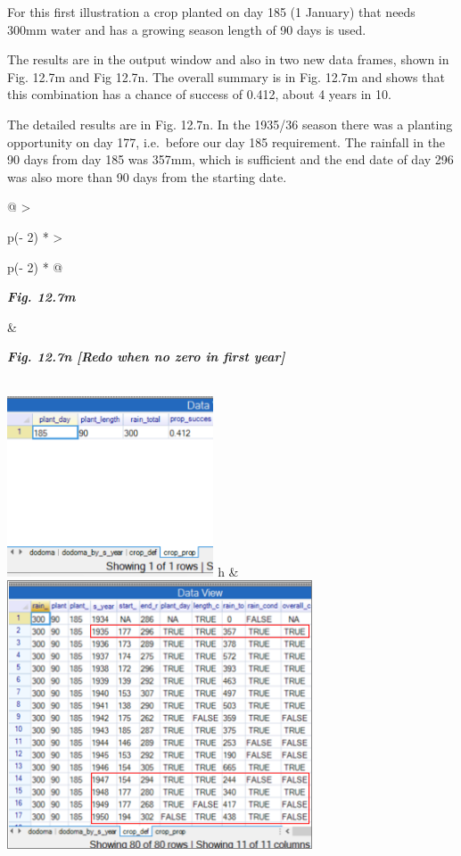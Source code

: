 \documentclass[
  letterpaper,
  DIV=11,
  numbers=noendperiod]{scrreprt}
\begin{document}
For this first illustration a crop planted on day 185 (1 January) that
needs 300mm water and has a growing season length of 90 days is used.

The results are in the output window and also in two new data frames,
shown in Fig. 12.7m and Fig 12.7n. The overall summary is in Fig. 12.7m
and shows that this combination has a chance of success of 0.412, about
4 years in 10.

The detailed results are in Fig. 12.7n. In the 1935/36 season there was
a planting opportunity on day 177, i.e.~before our day 185 requirement.
The rainfall in the 90 days from day 185 was 357mm, which is sufficient
and the end date of day 296 was also more than 90 days from the starting
date.

\begin{longtable}[]{@{}
  >{\raggedright\arraybackslash}p{(\columnwidth - 2\tabcolsep) * }
  >{\raggedright\arraybackslash}p{(\columnwidth - 2\tabcolsep) * }@{}}
\toprule\noalign{}
\begin{minipage}[b]{\linewidth}\raggedright
\textbf{\emph{Fig. 12.7m}}
\end{minipage} & \begin{minipage}[b]{\linewidth}\raggedright
\textbf{\emph{Fig. 12.7n {[}Redo when no zero in first year{]}}}
\end{minipage} \\
\midrule\noalign{}
\endhead
\bottomrule\noalign{}
\endlastfoot
\includegraphics[width=2.4112in,height=2.1079in]{figures/Fig12.7m.png} h
&
\includegraphics[width=3.56517in,height=\textheight]{figures/Fig12.7n.png} \\
\end{longtable}
\end{document}
